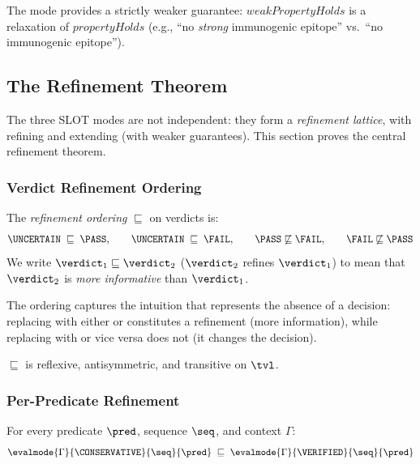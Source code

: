 The \PERMISSIVE{} mode provides a strictly weaker guarantee:
$\mathit{weakPropertyHolds}$ is a relaxation of
$\mathit{propertyHolds}$ (e.g., ``no \emph{strong} immunogenic
epitope'' vs.\ ``no immunogenic epitope'').

\subsection{The Refinement Theorem}\label{sec:refinement}

The three SLOT modes are not independent: they form a \emph{refinement
lattice}, with \VERIFIED{} refining \CONSERVATIVE{} and \PERMISSIVE{}
extending \VERIFIED{} (with weaker guarantees).
This section proves the central refinement theorem.

\subsubsection{Verdict Refinement Ordering}

\begin{definition}
The \emph{refinement ordering} $\sqsubseteq$ on verdicts is:
\[
  \UNCERTAIN \;\sqsubseteq\; \PASS,
  \qquad
  \UNCERTAIN \;\sqsubseteq\; \FAIL,
  \qquad
  \PASS \not\sqsubseteq \FAIL,
  \qquad
  \FAIL \not\sqsubseteq \PASS
\]
We write $\verdict_1 \sqsubseteq \verdict_2$ ($\verdict_2$ refines
$\verdict_1$) to mean that $\verdict_2$ is \emph{more informative}
than $\verdict_1$.
\end{definition}

The ordering captures the intuition that \UNCERTAIN{} represents the
absence of a decision: replacing \UNCERTAIN{} with either \PASS{} or
\FAIL{} constitutes a refinement (more information), while replacing
\PASS{} with \FAIL{} or vice versa does not (it changes the decision).

\begin{lemma}\label{lem:po}
$\sqsubseteq$ is reflexive, antisymmetric, and transitive on $\tvl$.
\end{lemma}

\subsubsection{Per-Predicate Refinement}

\begin{theorem}\label{thm:pred-refine}
For every predicate $\pred$, sequence $\seq$, and context $\Gamma$:
\[
  \evalmode{\Gamma}{\CONSERVATIVE}{\seq}{\pred}
  \;\sqsubseteq\;
  \evalmode{\Gamma}{\VERIFIED}{\seq}{\pred}
\]
\end{theorem}

